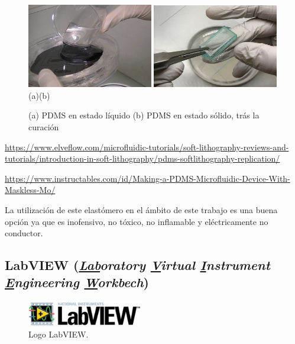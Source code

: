   	\begin{figure}[H]
	 	\centering
	 	\includegraphics[width=0.49\textwidth]{./img/liquidPDMS}
	 	\includegraphics[width=0.49\textwidth]{./img/solidPDMS} 
	 	\\(a)\hspace{7cm}(b)
	 	\caption{(a) PDMS en estado líquido \cite{liquidoPDMS} (b) PDMS en estado sólido, trás la curación \cite{solidoPDMS}} 
	 	\label{fig:slPDSM2}
	 \end{figure}
 
 	\url{https://www.elveflow.com/microfluidic-tutorials/soft-lithography-reviews-and-tutorials/introduction-in-soft-lithography/pdms-softlithography-replication/}
 
	\url{https://www.instructables.com/id/Making-a-PDMS-Microfluidic-Device-With-Maskless-Mo/}
	
  	 La utilización de este elastómero en el ámbito de este trabajo es una buena opción ya que es inofensivo, no tóxico, no inflamable y eléctricamente no conductor.\cite{nedomaPDMS}



		
\subsection{LabVIEW (\textit{\underline{Lab}oratory \underline{V}irtual \underline{I}nstrument \underline{E}ngineering \underline{W}orkbech})}

\label{sec:labview3}



	\begin{figure}[H]
		\centering
		\includegraphics[width=0.45\textwidth]{./img/LabVIEWicon}
		\caption{Logo LabVIEW. }
		\label{fig:LabVIEWicon}
	\end{figure}

